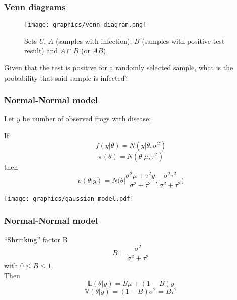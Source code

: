 \documentclass{beamer}
\newcommand{\E}{\mathbb{E}}
\newcommand{\V}{\mathbb{V}}
\newcommand{\1}{\ensuremath{\mathbf{1}}}
\begin{document}
%
%
%
\begin{frame}\frametitle{Venn diagrams}
	\begin{figure}
	\begin{center}
		\texttt{[image: graphics/venn\_diagram.png]}
	\end{center}
	\caption{Sets $U$, $A$ (samples with infection), $B$ (samples with positive test result) and $A \cap B$ (or $AB$).}
	\end{figure}
	Given that the test is positive for a randomly selected sample, what is the probability that said sample is infected?
\end{frame}
%
%
%
\begin{frame}\frametitle{Normal-Normal model}
	Let $y$ be number of observed frogs with disease:
	\begin{block}{}
		If
		\begin{equation}
			f(y|\theta) = N(y|\theta,\sigma^2)
		\end{equation}
		\begin{equation}
			\pi(\theta) = N(\theta|\mu,\tau^2)
		\end{equation}
		then
		\begin{equation}
			p(\theta|y) = N\Big( \theta \Big| \frac{\sigma^2\mu + \tau^2 y}{\sigma^2 + \tau^2}, \frac{\sigma^2\tau^2}{\sigma^2 + \tau^2} \Big)
		\end{equation}
	\end{block}
	\begin{center}
		\texttt{[image: graphics/gaussian\_model.pdf]}
	\end{center}
\end{frame}
%
%
%
\begin{frame}\frametitle{Normal-Normal model}
	\begin{block}{``Shrinking'' factor B}
		\begin{equation}
			B = \frac{\sigma^2}{\sigma^2 + \tau^2}
		\end{equation}
		with $0 \leq B \leq 1$.\\
		Then
		\begin{equation}
			\E(\theta|y) = B \mu + (1-B) y
		\end{equation}
		\begin{equation}
			\V(\theta|y) = (1-B)\sigma^2 = B \tau^2
		\end{equation}
	\end{block}
\end{frame}
\end{document}
